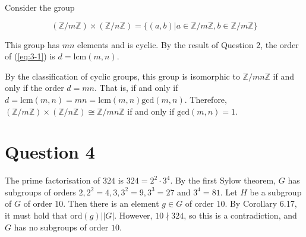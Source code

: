 \documentclass{article}
\begin{document}
Consider the group

\begin{equation} \label{eq:3-1}
(\mathbb{Z}/m\mathbb{Z})\times(\mathbb{Z}/n\mathbb{Z})
    = \{(a, b) | a \in \mathbb{Z}/m\mathbb{Z}, b \in \mathbb{Z}/m\mathbb{Z}\}
\end{equation}

This group has $mn$ elements and is cyclic. By the result of Question 2,
the order of (\ref{eq:3-1}) is $d = \text{lcm}(m, n)$.

\hfill \break
By the classification of cyclic groups, this group is isomorphic to
$\mathbb{Z}/mn\mathbb{Z}$ if and only if the order $d = mn$. That is,
if and only if $d = \text{lcm}(m, n) = mn = \text{lcm}(m, n)\text{gcd}(m, n)$.
Therefore, $(\mathbb{Z}/m\mathbb{Z})\times(\mathbb{Z}/n\mathbb{Z})
\cong \mathbb{Z}/mn\mathbb{Z}$ if and only if $\text{gcd}(m, n) = 1$.

\newpage
\section*{Question 4}

The prime factorisation of $324$ is $324 = 2^2\cdot 3^4$. By the first Sylow theorem,
$G$ has subgroups of orders $2, 2^2 = 4, 3, 3^2 = 9, 3^3 = 27$ and $3^4 = 81$. Let $H$
be a subgroup of $G$ of order $10$. Then there is an element $g \in G$
of order $10$. By Corollary 6.17, it must hold that $\text{ord}(g)||G|$. However,
$10 \nmid 324$, so this is a contradiction, and $G$ has no subgroups of order $10$.
\end{document}
